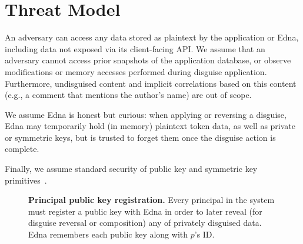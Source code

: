 
\section{Threat Model}
An adversary can access any data stored as plaintext by the application or Edna, including data not
exposed via its client-facing API. We assume that an adversary cannot access prior snapshots of the
application database, or observe modifications or memory accesses performed during disguise
application. Furthermore, undisguised content and implicit correlations based on this content (e.g.,
a comment that mentions the author’s name) are out of scope.

We assume Edna is honest but curious: when applying or reversing a disguise, Edna may temporarily
hold (in memory) plaintext token data, as well as private or symmetric keys, but is trusted to
forget them once the disguise action is complete.  

Finally, we assume standard security of public key and symmetric key primitives~.



\begin{figure*}[h!]
\caption{
\textbf{Principal public key registration.}
Every principal in the system must register a public key with Edna in order to later reveal (for
disguise reversal or composition) any of privately disguised data. Edna remembers each public
    key  along with $p$'s ID.}
\label{fig:acctreg}
\end{figure*}

